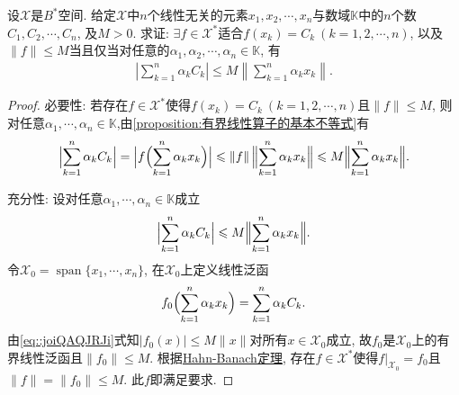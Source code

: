\documentclass[../../main.tex]{subfiles}%
\begin{document}
\begin{example}
设$\mathscr{X}$是$B^*$空间. 给定$\mathscr{X}$中$n$个线性无关的元素$x_1, x_2, \cdots, x_n$与数域$\mathbb{K}$中的$n$个数$C_1, C_2, \cdots, C_n$, 及$M > 0$. 求证: $\exists f \in \mathscr{X}^*$适合$f(x_k) = C_k \ (k=1,2,\cdots,n)$, 以及$\|f\| \leqslant M$当且仅当对任意的$\alpha_1, \alpha_2, \cdots, \alpha_n \in \mathbb{K}$, 有
\begin{align*}
\left| \sum\limits_{k=1}^n \alpha_k C_k \right| \leqslant M \left\| \sum\limits_{k=1}^n \alpha_k x_k \right\|.
\end{align*}
\end{example}
\begin{proof}

{\heiti 必要性:} 若存在$f\in\mathscr{X}^*$使得$f(x_k)=C_k\ (k=1,2,\cdots,n)$且$\|f\|\leqslant M$, 则对任意$\alpha_1,\cdots,\alpha_n\in\mathbb{K}$,由\cref{proposition:有界线性算子的基本不等式}有
\begin{align*}
\Bigl|\sum\limits_{k=1}^n \alpha_k C_k\Bigr| = \Bigl|f\Bigl(\sum\limits_{k=1}^n \alpha_k x_k\Bigr)\Bigr| \leqslant \|f\|\,\Bigl\|\sum\limits_{k=1}^n \alpha_k x_k\Bigr\| \leqslant M \Bigl\|\sum\limits_{k=1}^n \alpha_k x_k\Bigr\|.
\end{align*}

{\heiti 充分性:} 设对任意$\alpha_1,\cdots,\alpha_n\in\mathbb{K}$成立
\begin{align}\label{eq::joiQAQJRJi}
\Bigl|\sum\limits_{k=1}^n \alpha_k C_k\Bigr| \leqslant M \Bigl\|\sum\limits_{k=1}^n \alpha_k x_k\Bigr\|.
\end{align}
令$\mathscr{X}_0 = \operatorname{span}\{x_1,\cdots,x_n\}$, 在$\mathscr{X}_0$上定义线性泛函
\begin{align*}
f_0\Bigl(\sum\limits_{k=1}^n \alpha_k x_k\Bigr) = \sum\limits_{k=1}^n \alpha_k C_k.
\end{align*}
由\eqref{eq::joiQAQJRJi}式知$|f_0(x)|\leqslant M\|x\|$对所有$x\in\mathscr{X}_0$成立, 故$f_0$是$\mathscr{X}_0$上的有界线性泛函且$\|f_0\|\leqslant M$. 根据\hyperref[theorem:泛函分析--(哈恩-巴拿赫)Hahn-Banach定理]{Hahn-Banach定理}, 存在$f\in\mathscr{X}^*$使得$f|_{\mathscr{X}_0}=f_0$且$\|f\|=\|f_0\|\leqslant M$. 此$f$即满足要求.
\end{proof}
\end{document}
